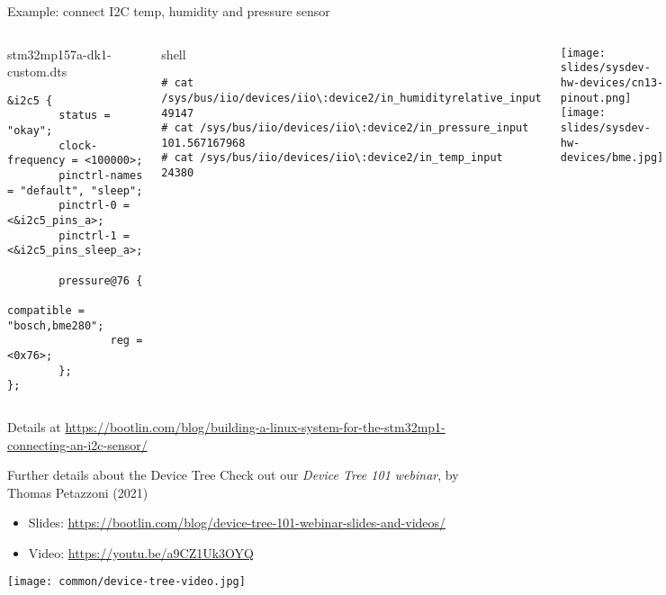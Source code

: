 \begin{frame}[fragile]{Example: connect I2C temp, humidity and pressure sensor}
  \begin{columns}
    \begin{block}{stm32mp157a-dk1-custom.dts}
      {\tiny
\begin{verbatim}
&i2c5 {
        status = "okay";
        clock-frequency = <100000>;
        pinctrl-names = "default", "sleep";
        pinctrl-0 = <&i2c5_pins_a>;
        pinctrl-1 = <&i2c5_pins_sleep_a>;

        pressure@76 {
                compatible = "bosch,bme280";
                reg = <0x76>;
        };
};
\end{verbatim}
}
  \end{block}

\begin{block}{shell}
{\tiny
\begin{verbatim}
# cat /sys/bus/iio/devices/iio\:device2/in_humidityrelative_input
49147
# cat /sys/bus/iio/devices/iio\:device2/in_pressure_input
101.567167968
# cat /sys/bus/iio/devices/iio\:device2/in_temp_input
24380
\end{verbatim}
}
\end{block}
  \begin{center}
    \texttt{[image: slides/sysdev-hw-devices/cn13-pinout.png]}\\
    \texttt{[image: slides/sysdev-hw-devices/bme.jpg]}
  \end{center}
\end{columns}
\vspace{0.5cm}
Details at
\url{https://bootlin.com/blog/building-a-linux-system-for-the-stm32mp1-connecting-an-i2c-sensor/}
\end{frame}

\begin{frame}{Further details about the Device Tree}
\small
Check out our {\em Device Tree 101 webinar}, by Thomas Petazzoni (2021)
\begin{itemize}
    \item Slides: \url{https://bootlin.com/blog/device-tree-101-webinar-slides-and-videos/}\\
    \item Video: \url{https://youtu.be/a9CZ1Uk3OYQ}
\end{itemize}
\vspace{0.5cm}
\texttt{[image: common/device-tree-video.jpg]}
\end{frame}

